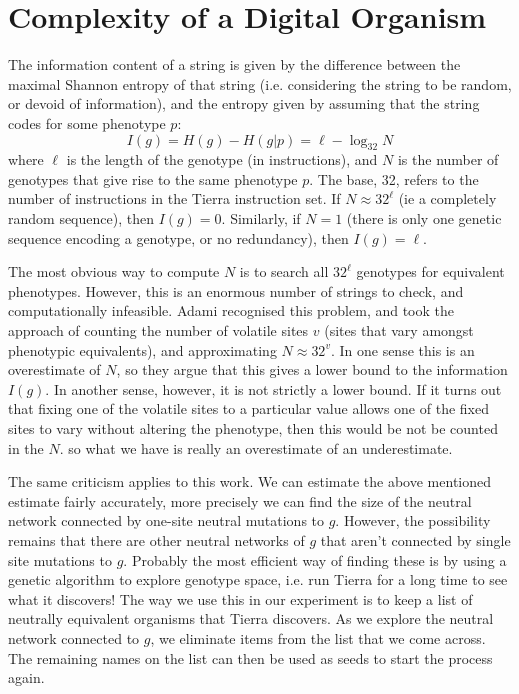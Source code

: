 \section{Complexity of a Digital Organism}

The information content of a string is given by the difference between
the maximal Shannon entropy of that string (i.e. considering the string
to be random, or devoid of information), and the entropy given by
assuming that the string codes for some phenotype $p$:\cite{Adami98,Layzer88}
\begin{equation}
I(g) = H(g) - H(g|p) = \ell - \log_{32}N
\end{equation}
where $\ell$ is the length of the genotype (in instructions), and $N$
is the number of genotypes that give rise to the same phenotype
$p$. The base, 32, refers to the number of instructions in the Tierra
instruction set. If $N\approx32^\ell$ (ie a completely random
sequence), then $I(g)=0$. Similarly, if $N=1$ (there is only one
genetic sequence encoding a genotype, or no redundancy), then $I(g)=\ell$.

The most obvious way to compute $N$ is to search all $32^\ell$
genotypes for equivalent phenotypes. However, this is an enormous
number of strings to check, and computationally infeasible. Adami
recognised this problem, and took the approach of counting the number
of volatile sites $v$ (sites that vary amongst phenotypic equivalents),
and approximating $N\approx 32^v$. In one sense this is an
overestimate of $N$, so they argue that this gives a lower bound to
the information $I(g)$. In another sense, however, it is not strictly
a lower bound. If it turns out that fixing one of the volatile sites
to a particular value allows one of the fixed sites to vary without
altering the phenotype, then this would be not be counted in the
$N$. so what we have is really an overestimate of an underestimate.

The same criticism applies to this work. We can estimate the above
mentioned estimate fairly accurately, more precisely we can find the
size of the neutral network\cite{Kauffman95,Reidys-etal96, Schuster97}
connected by one-site neutral mutations to $g$. However, the
possibility remains that there are other neutral networks of $g$ that
aren't connected by single site mutations to $g$. Probably the most
efficient way of finding these is by using a genetic algorithm to
explore genotype space, i.e. run Tierra for a long time to see what it
discovers! The way we use this in our experiment is to keep a list of
neutrally equivalent organisms that Tierra discovers. As we explore
the neutral network connected to $g$, we eliminate items from the list
that we come across. The remaining names on the list can then be used
as seeds to start the process again.

